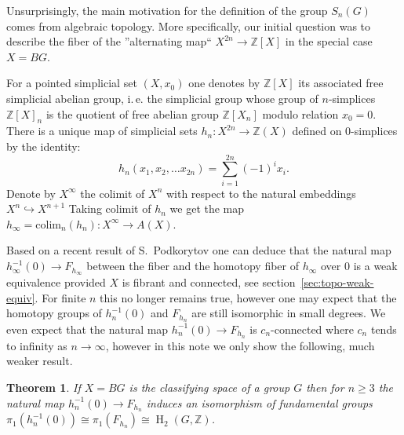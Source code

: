 \documentclass[oneside, 12pt]{amsart}
\theoremstyle{plain}
\newtheorem{thm}{Theorem}
\numberwithin{equation}{section}
\numberwithin{lemma}{section}
\theoremstyle{remark}
\theoremstyle{definition}
\DeclareMathOperator{\HH}{H}
\DeclareMathOperator{\colim}{colim}
\newcommand{\ZZ}{\mathbb{Z}}
\begin{document}

Unsurprisingly, the main motivation for the definition of the group $S_n(G)$ comes from algebraic topology.
More specifically, our initial question was to describe the fiber of the ''alternating map`` $X^{2n} \to \mathbb{Z}[X]$ in the special case $X=BG$.

For a pointed simplicial set $(X, x_0)$ one denotes by $\ZZ[X]$ its associated free simplicial abelian group,
 i.\,e. the simplicial group whose group of $n$-simplices $\ZZ[X]_n$ is the quotient of free abelian group $\ZZ[X_n]$ modulo relation $x_0=0$.
There is a unique map of simplicial sets $h_n\colon X^{2n} \to \ZZ(X)$ defined on $0$-simplices by the identity:
 \[h_n(x_1, x_2, \ldots x_{2n}) = \sum\limits_{i=1}^{2n}(-1)^ix_i.\]
Denote by $X^\infty$ the colimit of $X^n$ with respect to the natural embeddings $X^{n} \hookrightarrow X^{n+1}$
Taking colimit of $h_n$ we get the map $h_\infty = \mathrm{colim}_n(h_n) \colon X^\infty \to A(X)$.

Based on a recent result of S.~Podkorytov one can deduce that the natural map $h^{-1}_\infty(0) \to F_{h_\infty}$
 between the fiber and the homotopy fiber of $h_\infty$ over $0$ is a weak equivalence provided $X$ is fibrant and connected, see section~\ref{sec:topo-weak-equiv}.
For finite $n$ this no longer remains true, however one may expect that the homotopy groups of $h^{-1}_n(0)$ and $F_{h_n}$ are still
 isomorphic in small degrees. %
We even expect that the natural map $h^{-1}_n(0) \to F_{h_n}$ is $c_n$-connected where $c_n$ tends to infinity as $n\to \infty$,
however in this note we only show the following, much weaker result.
\begin{thm} \label{thm:main} If $X=BG$ is the classifying space of a group $G$ then for $n\geq 3$ the natural map $h_n^{-1}(0) \to F_{h_n}$ induces an isomorphism of fundamental groups
 $\pi_1(h^{-1}_n(0))\cong \pi_1(F_{h_n}) \cong \HH_2(G, \ZZ)$. \end{thm}
\end{document}
